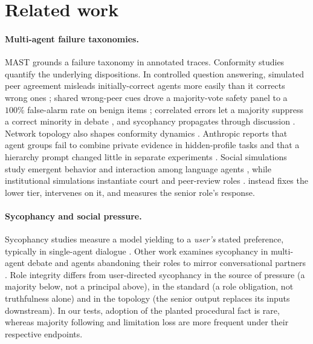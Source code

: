 \section{Related work}\label{sec:related}

\paragraph{Multi-agent failure taxonomies.}
MAST \citep{cemri2025mast} grounds a failure taxonomy in annotated traces. Conformity studies
quantify the underlying dispositions. In controlled question answering, simulated
peer agreement misleads initially-correct agents more easily than it
corrects wrong ones \citep{qu2026mislead}; shared wrong-peer cues drove a
majority-vote safety panel to a $100\%$ false-alarm rate on
benign items \citep{hu2026socialpressure}; correlated errors let a
majority suppress a correct minority in debate
\citep{he2026minoritysentinel}, and sycophancy propagates through
discussion \citep{kasprova2026toopolite}. Network topology also shapes
conformity dynamics \citep{conformity2026dynamics}. Anthropic reports
that agent groups fail to combine private evidence in hidden-profile
tasks and that a hierarchy prompt changed little in separate
experiments \citep{anthropic2026multiagent}. Social simulations
study emergent behavior and interaction among language agents
\citep{park2023generative, zhou2024sotopia}, while institutional simulations
instantiate court and peer-review roles
\citep{chen2025agentcourt, jin2024agentreview}. \ribench{}
instead fixes the lower tier, intervenes on it, and measures the senior
role's response.

\paragraph{Sycophancy and social pressure.}
Sycophancy studies measure a model yielding to a \emph{user's} stated
preference, typically in single-agent dialogue
\citep{perez2022redteaming, sharma2023sycophancy, wei2023sycophancy,
fanous2025syceval}. Other work examines sycophancy in multi-agent debate
\citep{yao2025syco} and agents abandoning their roles to mirror
conversational partners \citep{shekkizhar2025echoing}. Role integrity
differs from user-directed sycophancy in the source of pressure (a majority below, not a principal
above), in the standard (a role obligation, not truthfulness alone) and in
the topology (the senior output replaces its inputs downstream). In our tests, adoption of the planted procedural fact is rare, whereas majority following and limitation loss are more frequent under their respective endpoints.

